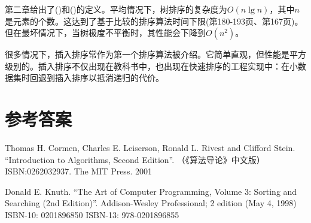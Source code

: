 \documentclass[b5paper]{ctexart}
\begin{document}
第二章给出了()和()的定义。平均情况下，树排序的复杂度为$O(n \lg n)$，其中$n$是元素的个数。这达到了基于比较的排序算法时间下限(\cite{Knuth-V3}第180-193页、\cite{CLRS}第167页)。但在最坏情况下，当树极度不平衡时，其性能会下降到$O(n^2)$。

很多情况下，插入排序常作为第一个排序算法被介绍。它简单直观，但性能是平方级别的。插入排序不仅出现在教科书中，也出现在快速排序的工程实现中：在小数据集时回退到插入排序以抵消递归的代价。

\ifx\wholebook\relax \else
\section{参考答案}
\shipoutAnswer

\begin{thebibliography}{99}

Thomas H. Cormen, Charles E. Leiserson, Ronald L. Rivest and Clifford Stein.
``Introduction to Algorithms, Second Edition''. （《算法导论》中文版）ISBN:0262032937. The MIT Press. 2001

Donald E. Knuth. ``The Art of Computer Programming, Volume 3: Sorting and Searching (2nd Edition)''. Addison-Wesley Professional; 2 edition (May 4, 1998) ISBN-10: 0201896850 ISBN-13: 978-0201896855

\end{thebibliography}
\end{document}
